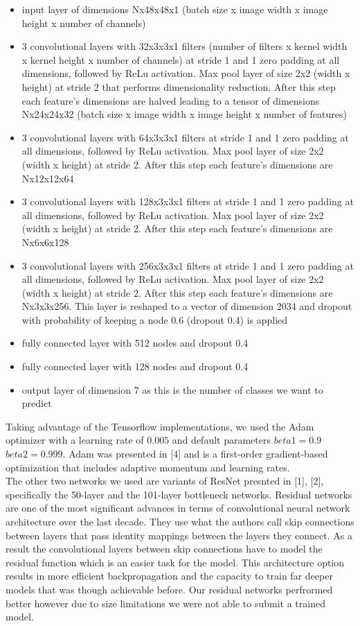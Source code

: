 \documentclass[12pt,twoside]{article}
\begin{document}
\begin{itemize}
\item input layer of dimensions Nx48x48x1 (batch size x image width x image height x number of channels)
\item 3 convolutional layers with 32x3x3x1 filters (number of filters x kernel width x kernel height x number of channels) at stride 1 and 1 zero padding at all dimensions, followed by ReLu activation.  Max pool layer of size 2x2 (width x height) at stride 2 that performs dimensionality reduction. After this step each feature's dimensions are halved leading to a tensor of dimensions Nx24x24x32 (batch size x image width x image height x number of features)
\item 3 convolutional layers with 64x3x3x1 filters at stride 1 and 1 zero padding at all dimensions, followed by ReLu activation. Max pool layer of size 2x2 (width x height) at stride 2. After this step each feature's dimensions are Nx12x12x64 
\item 3 convolutional layers with 128x3x3x1 filters at stride 1 and 1 zero padding at all dimensions, followed by ReLu activation. Max pool layer of size 2x2 (width x height) at stride 2. After this step each feature's dimensions are Nx6x6x128 
\item 3 convolutional layers with 256x3x3x1 filters at stride 1 and 1 zero padding at all dimensions, followed by ReLu activation. Max pool layer of size 2x2 (width x height) at stride 2. After this step each feature's dimensions are Nx3x3x256. This  layer is reshaped to a vector of dimension 2034 and dropout with probability of keeping a node 0.6 (dropout 0.4) is applied
\item fully connected layer with 512 nodes and dropout 0.4
\item fully connected layer with 128 nodes and dropout 0.4
\item output layer of dimension 7 as this is the number of classes we want to predict
\end{itemize}

Taking advantage of the Tensorflow implementations, we used the Adam optimizer with a learning rate of $0.005$ and default parameters $beta1=0.9$ $beta2=0.999$. Adam was presented in [4] and is a first-order gradient-based optimization that includes adaptive momentum and learning rates. \\


The other two networks we used are variants of ResNet presnted in [1], [2], specifically the 50-layer and the 101-layer bottleneck networks. Residual networks are one of the most significant advances in terms of convolutional neural network architecture over the last decade. They use what the authors call skip connections between layers that pass identity mappings between the layers they connect. As a result the convolutional layers between skip connections have to model the residual function which is an easier task for the model. This architecture option results in more efficient backpropagation and the capacity to train far deeper models that was though achievable before. Our residual networks perfrormed better however due to size limitations we were not able to submit a trained model. 
\end{document}
